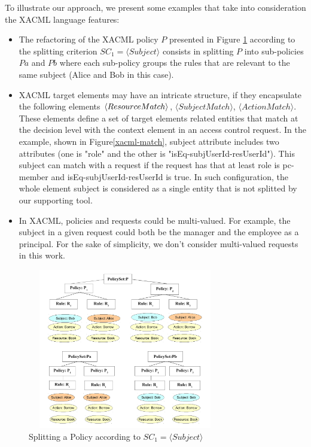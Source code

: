 To illustrate our approach, we present some examples that take into consideration the XACML language features:
\begin{itemize}
\item The refactoring of the XACML policy $P$ presented in Figure \ref{splitting} according to the splitting criterion $SC_{1}=\langle Subject\rangle$ consists in splitting $P$ 
into sub-policies $Pa$ and $Pb$ where each sub-policy groups the rules that are relevant to the same subject (Alice and Bob in this case). 

\item
XACML target elements may have an intricate structure, if they encapsulate the following elements $\langle Resou\-rceMatch\rangle$, $\langle SubjectMatch\rangle$, $\langle ActionMatch\rangle$.
These elements define a set of target elements related entities that match at the decision level with the context element in 
an access control request. In the example, shown in Figure\ref{xacml-match}, subject attribute includes two attributes (one is "role" and the other is "isEq-subjUserId-resUserId"). 
This subject can match with a request if the request has that at least role is pc-member and isEq-subjUserId-resUserId is true. In such configuration, the whole element subject is considered 
as a single entity that is not splitted by our supporting tool.

\item 

In XACML, policies and requests could be multi-valued. For example, the subject in a given request could both be the manager and the employee as a principal.
For the sake of simplicity, we don't consider multi-valued requests in this work.
\end{itemize}
\begin{figure}[!h]
\begin{center}
\includegraphics[width=8.5cm, height=7cm]{splitting}
\caption{Splitting a Policy according to $SC_{1}=\langle Subject\rangle$}
\label{splitting}
\end{center}
\end{figure} 


